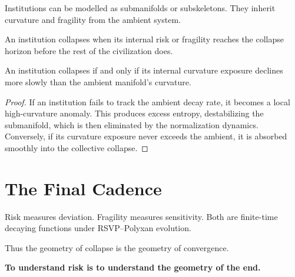 Institutions can be modelled as submanifolds or subskeletons.
They inherit curvature and fragility from the ambient system.

An institution collapses when its internal risk or fragility reaches
the collapse horizon before the rest of the civilization does.

\begin{proposition}
An institution collapses if and only if its internal curvature exposure
declines more slowly than the ambient manifold’s curvature.
\end{proposition}

\begin{proof}
If an institution fails to track the ambient decay rate,
it becomes a local high-curvature anomaly.  
This produces excess entropy, destabilizing the submanifold, which is
then eliminated by the normalization dynamics.  
Conversely, if its curvature exposure never exceeds the ambient, it is
absorbed smoothly into the collective collapse.
\end{proof}

\section{The Final Cadence}

Risk measures deviation.  
Fragility measures sensitivity.  
Both are finite-time decaying functions under RSVP--Polyxan evolution.

Thus the geometry of collapse is the geometry of convergence.

\begin{center}
\textbf{To understand risk is to understand the geometry of the end.}
\end{center}


